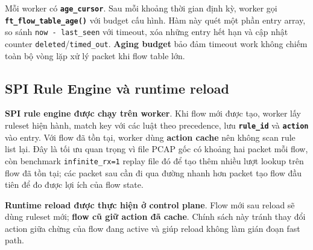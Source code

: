\documentclass[12pt,a4paper,twoside]{report}
\newcommand{\code}[1]{\texttt{#1}}
\begin{document}
Mỗi worker có \textbf{\code{age\_cursor}}. Sau mỗi khoảng thời gian định kỳ,
worker gọi \textbf{\code{ft\_flow\_table\_age()}} với budget cấu hình. Hàm này
quét một phần entry array, so sánh \code{now - last\_seen} với timeout, xóa
những entry hết hạn và cập nhật counter \code{deleted}/\code{timed\_out}.
\textbf{Aging budget} bảo đảm timeout work không chiếm toàn bộ vòng lặp xử lý
packet khi flow table lớn.

\subsection{SPI Rule Engine và runtime reload}
\textbf{SPI rule engine được chạy trên worker}. Khi flow mới được tạo, worker
lấy ruleset hiện hành, match key với các luật theo precedence, lưu
\textbf{\code{rule\_id}} và \textbf{\code{action}} vào entry. Với flow đã tồn
tại, worker dùng \textbf{action cache} nên không scan rule list lại. Đây là tối
ưu quan trọng vì file PCAP gốc có khoảng hai packet mỗi flow, còn benchmark
\code{infinite\_rx=1} replay file đó để tạo thêm nhiều lượt lookup trên flow đã
tồn tại; các packet sau cần đi qua đường nhanh hơn packet tạo flow đầu tiên để
đo được lợi ích của flow state.

\textbf{Runtime reload được thực hiện ở control plane}. Flow mới sau reload sẽ
dùng ruleset mới; \textbf{flow cũ giữ action đã cache}. Chính sách này tránh
thay đổi action giữa chừng của flow đang active và giúp reload không làm gián
đoạn fast path.
\end{document}
